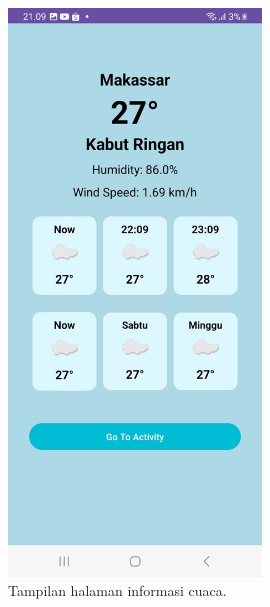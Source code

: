 \documentclass[journal,article,submit,pdftex,moreauthors]{Definitions/mdpi}
\begin{document}
\begin{figure}[H]
    \centering
    \includegraphics[width=0.6\textwidth]{Definitions/images/03.jpeg}
    \caption{Tampilan halaman informasi cuaca.}
    \label{fig:activity-tracking}
\end{figure}
\end{document}

